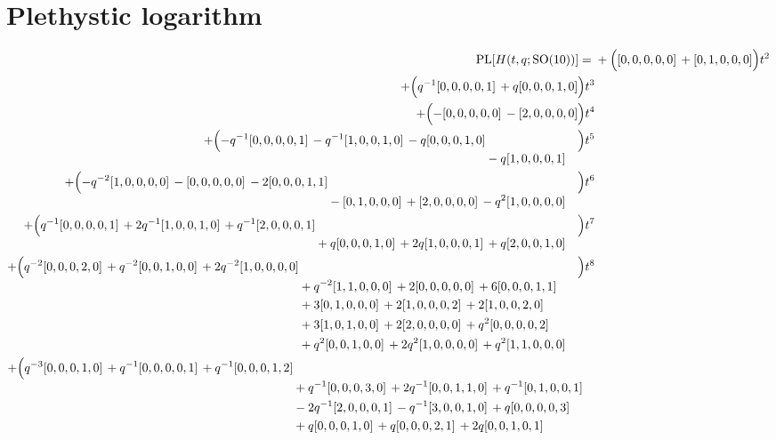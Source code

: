 \documentclass[10pt]{article}
\begin{document}
\section{Plethystic logarithm}
\[
\begin{aligned}
\operatorname{PL}[H(t,q;\mathrm{SO}(10))] ={}&
  + \Bigl([0,0,0,0,0]\,+[0,1,0,0,0]\Bigr)t^{2} \\
  + \Bigl(q^{-1}[0,0,0,0,1]\,+q[0,0,0,1,0]\Bigr)t^{3} \\
  + \Bigl(-[0,0,0,0,0]\,-[2,0,0,0,0]\Bigr)t^{4} \\
  + \Bigl(\begin{aligned}[t]-q^{-1}[0,0,0,0,1]\,-q^{-1}[1,0,0,1,0]\,-q[0,0,0,1,0] \\
  &{}-q[1,0,0,0,1]\end{aligned}\Bigr)t^{5} \\
  + \Bigl(\begin{aligned}[t]-q^{-2}[1,0,0,0,0]\,-[0,0,0,0,0]\,-2[0,0,0,1,1] \\
  &{}-[0,1,0,0,0]\,+[2,0,0,0,0]\,-q^{2}[1,0,0,0,0]\end{aligned}\Bigr)t^{6} \\
  + \Bigl(\begin{aligned}[t]q^{-1}[0,0,0,0,1]\,+2q^{-1}[1,0,0,1,0]\,+q^{-1}[2,0,0,0,1] \\
  &{}+q[0,0,0,1,0]\,+2q[1,0,0,0,1]\,+q[2,0,0,1,0]\end{aligned}\Bigr)t^{7} \\
  + \Bigl(\begin{aligned}[t]q^{-2}[0,0,0,2,0]\,+q^{-2}[0,0,1,0,0]\,+2q^{-2}[1,0,0,0,0] \\
  &{}+q^{-2}[1,1,0,0,0]\,+2[0,0,0,0,0]\,+6[0,0,0,1,1] \\
  &{}+3[0,1,0,0,0]\,+2[1,0,0,0,2]\,+2[1,0,0,2,0] \\
  &{}+3[1,0,1,0,0]\,+2[2,0,0,0,0]\,+q^{2}[0,0,0,0,2] \\
  &{}+q^{2}[0,0,1,0,0]\,+2q^{2}[1,0,0,0,0]\,+q^{2}[1,1,0,0,0]\end{aligned}\Bigr)t^{8} \\
  + \Bigl(\begin{aligned}[t]q^{-3}[0,0,0,1,0]\,+q^{-1}[0,0,0,0,1]\,+q^{-1}[0,0,0,1,2] \\
  &{}+q^{-1}[0,0,0,3,0]\,+2q^{-1}[0,0,1,1,0]\,+q^{-1}[0,1,0,0,1] \\
  &{}-2q^{-1}[2,0,0,0,1]\,-q^{-1}[3,0,0,1,0]\,+q[0,0,0,0,3] \\
  &{}+q[0,0,0,1,0]\,+q[0,0,0,2,1]\,+2q[0,0,1,0,1] \\

\end{aligned}
\end{aligned}\]
\end{document}
